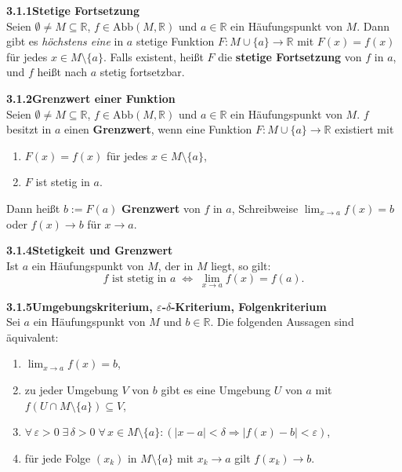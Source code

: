 \documentclass[a4paper,12pt]{article}
\newcommand{\gentry}[3]{%
  \noindent\textbf{#1\quad #2}\nopagebreak\\[0.2em]
  #3\par\smallskip
}
\begin{document}
\gentry{3.1.1}{Stetige Fortsetzung}{%
  Seien $\emptyset \neq M \subseteq \mathbb{R}$, $f \in \mathrm{Abb}(M, \mathbb{R})$ und
  $a \in \mathbb{R}$ ein H\"aufungspunkt von $M$. Dann gibt es \emph{h\"ochstens eine}
  in $a$ stetige Funktion $F : M \cup \{a\} \to \mathbb{R}$ mit
  $F(x) = f(x)$ f\"ur jedes $x \in M \setminus \{a\}$. Falls existent, hei{\ss}t $F$
  die \textbf{stetige Fortsetzung} von $f$ in $a$, und $f$ hei{\ss}t nach $a$
  stetig fortsetzbar.
}

\gentry{3.1.2}{Grenzwert einer Funktion}{%
  Seien $\emptyset \neq M \subseteq \mathbb{R}$, $f \in \mathrm{Abb}(M, \mathbb{R})$ und
  $a \in \mathbb{R}$ ein H\"aufungspunkt von $M$. $f$ besitzt in $a$ einen
  \textbf{Grenzwert}, wenn eine Funktion $F : M \cup \{a\} \to \mathbb{R}$ existiert mit
  \begin{enumerate}[label=(\roman*),topsep=2pt,itemsep=1pt]
    \item $F(x) = f(x)$ f\"ur jedes $x \in M \setminus \{a\}$,
    \item $F$ ist stetig in $a$.
  \end{enumerate}
  Dann hei{\ss}t $b := F(a)$ \textbf{Grenzwert} von $f$ in $a$, Schreibweise
  $\lim_{x \to a} f(x) = b$ oder $f(x) \to b$ f\"ur $x \to a$.
}

\gentry{3.1.4}{Stetigkeit und Grenzwert}{%
  Ist $a$ ein H\"aufungspunkt von $M$, der in $M$ liegt, so gilt:
  \[
    f \text{ ist stetig in } a \;\Longleftrightarrow\; \lim_{x \to a} f(x) = f(a).
  \]
}

\gentry{3.1.5}{Umgebungskriterium, $\varepsilon$-$\delta$-Kriterium, Folgenkriterium}{%
  Sei $a$ ein H\"aufungspunkt von $M$ und $b \in \mathbb{R}$. Die folgenden
  Aussagen sind \"aquivalent:
  \begin{enumerate}[label=(\roman*),topsep=2pt,itemsep=1pt]
    \item $\lim_{x \to a} f(x) = b$,
    \item zu jeder Umgebung $V$ von $b$ gibt es eine Umgebung $U$ von $a$ mit
          $f(U \cap M \setminus \{a\}) \subseteq V$,
    \item $\forall\, \varepsilon > 0 \; \exists\, \delta > 0 \; \forall\, x \in M \setminus \{a\}:
          (|x - a| < \delta \Rightarrow |f(x) - b| < \varepsilon)$,
    \item f\"ur jede Folge $(x_k)$ in $M \setminus \{a\}$ mit $x_k \to a$ gilt $f(x_k) \to b$.
  \end{enumerate}
}
\end{document}
